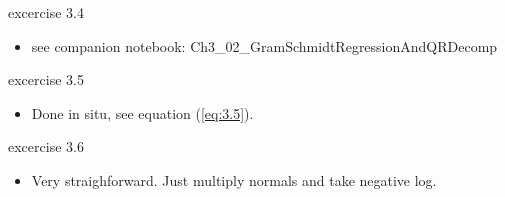 \documentclass[a4paper]{report}
\newcommand{\<}{\textless}
\renewcommand{\>}{\textgreater}
\begin{document}
excercise 3.4
\begin{itemize}
  \item see companion notebook: Ch3\_02\_GramSchmidtRegressionAndQRDecomp
\end{itemize}

excercise 3.5
\begin{itemize}
  \item Done in situ, see equation (\ref{eq:3.5}).
\end{itemize}

excercise 3.6
\begin{itemize}
  \item Very straighforward. Just multiply normals and take negative log.
\end{itemize}
\end{document}
